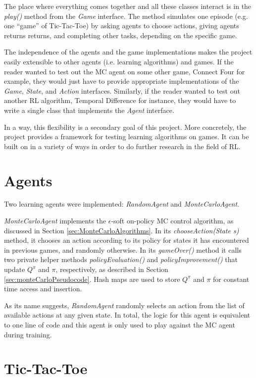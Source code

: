 \documentclass[11pt,a4paper]{report}
\begin{document}
The place where everything comes together and all these classes interact is in the \emph{play()} method from the \emph{Game} interface. The method simulates one episode (e.g. one ``game'' of Tic-Tac-Toe) by asking agents to choose actions, giving agents returns returns, and completing other tasks, depending on the specific game.

The independence of the agents and the game implementations makes the project easily extensible to other agents (i.e. learning algorithms) and games. If the reader wanted to test out the MC agent on some other game, Connect Four for example, they would just have to provide appropriate implementations of the \emph{Game}, \emph{State}, and \emph{Action} interfaces. Similarly, if the reader wanted to test out another RL algorithm, Temporal Difference for instance, they would have to  write a single class that implements the \emph{Agent} interface.

In a way, this flexibility is a secondary goal of this project. More concretely, the project provides a framework for testing learning algorithms on games. It can be built on in a variety of ways in order to do further research in the field of RL.


\section{Agents}
\label{sec:Agents}

Two learning agents were implemented: \emph{RandomAgent} and \emph{MonteCarloAgent}.

\emph{MonteCarloAgent} implements the $\epsilon$-soft on-policy MC control algorithm, as discussed in Section \ref{sec:MonteCarloAlgorithms}. In its \emph{chooseAction(State s)} method, it chooses an action according to its policy for states it has encountered in previous games, and randomly otherwise. In its \emph{gameOver()} method it calls two private helper methods \emph{policyEvaluation()} and \emph{policyImprovement()} that update $Q^{\pi}$ and $\pi$, respectively, as described in Section \ref{sec:monteCarloPseudocode}. Hash maps are used to store $Q^{\pi}$ and $\pi$ for constant time access and insertion.

As its name suggests, \emph{RandomAgent} randomly selects an action from the list of available actions at any given state. In total, the logic for this agent is equivalent to one line of code and this agent is only used to play against the MC agent during training.


\section{Tic-Tac-Toe}
\label{sec:TicTacToe}
\end{document}
